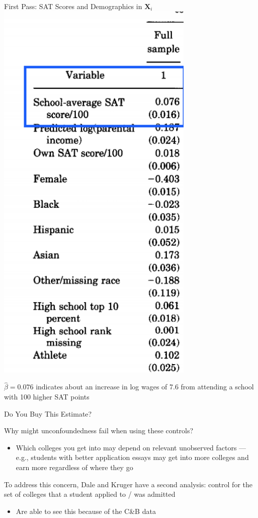 \documentclass[11pt,english,handout]{beamer}
\newenvironment{wideitemize}{\itemize\addtolength{\itemsep}{10pt}}{\enditemize}
\begin{document}
\begin{frame}{First Pass: SAT Scores and Demographics in $\bm{X}_i$ }
	\includegraphics[width =0.3\linewidth]{dk-results-table-reg1}
	
	\begin{wideitemize}
		\item
		$\hat\beta = 0.076$ indicates about an increase in log wages of 7.6 from attending a school with 100 higher SAT points 
	\end{wideitemize}
\end{frame}

\begin{frame}{Do You Buy This Estimate?}
	\begin{wideitemize}
		\item
		Why might unconfoundedness fail when using these controls? \smallskip
			\pause
			\begin{itemize}
				\item 
				Which colleges you get into may depend on relevant unobserved factors --- e.g., students with better application essays may get into more colleges and earn more regardless of where they go
			\end{itemize}
		
		\pause
		\item
		To address this concern, Dale and Kruger have a second analysis: control for the set of colleges that a student applied to / was admitted\smallskip
\pause
			\begin{itemize}
				\item 
				Are able to see this because of the C\&B data
			\end{itemize}
		
		
	\end{wideitemize}
	
\end{frame}
\end{document}
